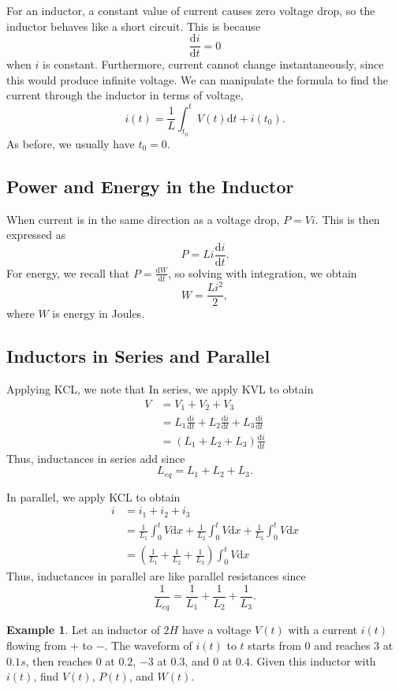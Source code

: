 \documentclass[11pt]{article}
\theoremstyle{plain} %
\theoremstyle{definition}
\theoremstyle{example}
\newtheorem*{example}{Example}
\theoremstyle{remark}
\begin{document}
For an inductor, a constant value of current causes zero voltage drop, so the inductor behaves like a short circuit. This is because 
$$\frac{\mathrm d i}{\mathrm d t } = 0$$
when $i$ is constant. Furthermore, current cannot change instantaneously, since this would produce infinite voltage. We can manipulate the formula to find the current through the inductor in terms of voltage,
$$i(t) = \frac{1}{L}\int_{t_0}^tV(t)\mathrm d t + i(t_0).$$
As before, we usually have $t_0 = 0$. 

\subsection{Power and Energy in the Inductor}

When current is in the same direction as a voltage drop, $P=Vi$. This is then expressed as 
$$P = Li\frac{\mathrm d i}{\mathrm d t}.$$
For energy, we recall that $P = \frac{\mathrm d W}{\mathrm d t}$, so solving with integration, we obtain 
$$W = \frac{Li^2}{2},$$
where $W$ is energy in Joules. 

\subsection{Inductors in Series and Parallel}

Applying KCL, we note that 
In series, we apply KVL to obtain 
\begin{align*}
	V &= V_1+V_2+V_3\\
	&= L_1\frac{\mathrm d i}{\mathrm d t} +L_2\frac{\mathrm d i}{\mathrm d t} +L_3\frac{\mathrm d i}{\mathrm d t} \\
	&= (L_1+L_2+L_3)\frac{\mathrm d i}{\mathrm d t}
\end{align*}
Thus, inductances in series add since 
$$L_{eq} = L_1+L_2+L_3.$$

In parallel, we apply KCL to obtain
\begin{align*}
	i &= i_1+i_2+i_3\\
	&= \frac{1}{L_1}\int_0^tV\mathrm d x + \frac{1}{L_2}\int_0^tV\mathrm d x + \frac{1}{L_3}\int_0^tV\mathrm d x \\
		&= \left(\frac{1}{L_1}+ \frac{1}{L_2}+\frac{1}{L_3}\right)\int_0^tV\mathrm d x
\end{align*}
Thus, inductances in parallel are like parallel resistances since 
$$\frac{1}{L_{eq}} = \frac{1}{L_1}+ \frac{1}{L_2}+\frac{1}{L_3}.$$
\begin{example}
Let an inductor of $2H$ have a voltage $V(t)$ with a current $i(t)$ flowing from $+$ to $-$. The waveform of $i(t)$ to $t$ starts from 0 and reaches $3$ at $0.1s$, then reaches $0$ at $0.2$, $-3$ at $0.3$, and $0$ at $0.4$. Given this inductor with $i(t)$, find $V(t)$, $P(t)$, and $W(t)$.
\end{example}
\end{document}
